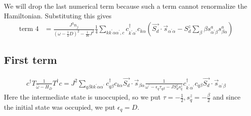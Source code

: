 \documentclass{revtex4-2}
\numberwithin{equation}{section}
\begin{document}
We will drop the last numerical term because such a term cannot renormalize the Hamiltonian. Substituting this gives
\begin{equation}\begin{aligned}
	\label{term2}
	\text{term 4} &= \frac{J^3 n_j}{\left(\omega - \frac{1}{2}D\right)^2 - \frac{1}{16}J^2} \frac{1}{4}\sum_{k k^\prime \alpha \alpha^\prime,c} c^\dagger_{k^\prime\alpha^\prime} c_{k\alpha} \left(\vec{S_d}\cdot\vec{s}_{\alpha^\prime\alpha} -S_d^z \sum_\beta \beta s^a_{\alpha^\prime\beta} s^a_{\beta\alpha} \right)
\end{aligned}\end{equation}

\subsection{First term}
\begin{align}
	c^\dagger T \frac{1}{\hat \omega - H_D}T^\dagger c = J^2\sum_{q\beta k k^\prime \alpha \alpha^\prime} c^\dagger_{q\beta} c_{k\alpha} \vec{S_d}\cdot\vec{s}_{\beta \alpha} \frac{1}{\omega^\prime - \epsilon_q\tau_{q\beta} - J S_d^z s_q^z}c^\dagger_{k^\prime\alpha^\prime} c_{q\beta} \vec{S_d}\cdot\vec{s}_{\alpha^\prime \beta}
\end{align}
Here the intermediate state is unoccupied, so we put \(\tau = -\frac{1}{2}, s_q^z = -\frac{\beta}{2}\) and since the initial state was occupied, we put \(\epsilon_q = D\).
\end{document}
